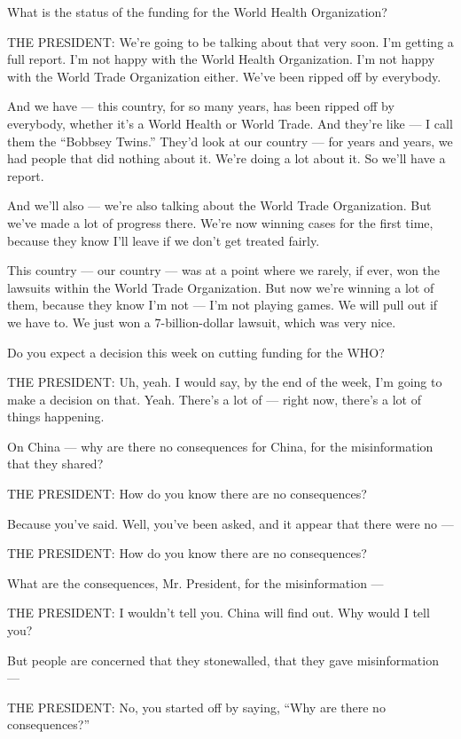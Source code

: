 What is the status of the funding for the World Health Organization?

THE PRESIDENT: We're going to be talking about that very soon. I'm
getting a full report. I'm not happy with the World Health Organization.
I'm not happy with the World Trade Organization either. We've been
ripped off by everybody.

And we have --- this country, for so many years, has been ripped off by
everybody, whether it's a World Health or World Trade. And they're like
--- I call them the ``Bobbsey Twins.'' They'd look at our country ---
for years and years, we had people that did nothing about it. We're
doing a lot about it. So we'll have a report.

And we'll also --- we're also talking about the World Trade
Organization. But we've made a lot of progress there. We're now winning
cases for the first time, because they know I'll leave if we don't get
treated fairly.

This country --- our country --- was at a point where we rarely, if
ever, won the lawsuits within the World Trade Organization. But now
we're winning a lot of them, because they know I'm not --- I'm not
playing games. We will pull out if we have to. We just won a
7-billion-dollar lawsuit, which was very nice.

Do you expect a decision this week on cutting funding for the WHO?

THE PRESIDENT: Uh, yeah. I would say, by the end of the week, I'm going
to make a decision on that. Yeah. There's a lot of --- right now,
there's a lot of things happening.

On China --- why are there no consequences for China, for the
misinformation that they shared?

THE PRESIDENT: How do you know there are no consequences?

Because you've said. Well, you've been asked, and it appear that there
were no ---

THE PRESIDENT: How do you know there are no consequences?

What are the consequences, Mr. President, for the misinformation ---

THE PRESIDENT: I wouldn't tell you. China will find out. Why would I
tell you?

But people are concerned that they stonewalled, that they gave
misinformation ---

THE PRESIDENT: No, you started off by saying, ``Why are there no
consequences?''

